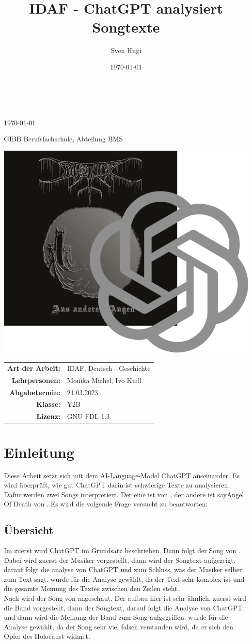 \documentclass[twocolumn,10pt]{article}
\author{Sven Hugi}
\title{IDAF - ChatGPT analysiert Songtexte}
\date{\today}
\makeatletter
\renewcommand{\maketitle}{
	\begin{center}

		\vspace*{.125\textheight}
		{\Huge \textbf{\@title}\\}
		{\LARGE \textbf{\@author}\\}
		{\large \today\\}
		{\Large GIBB Berufsfachschule, Abteilung BMS\par\vspace*{1cm}}
		\includegraphics[width=\linewidth]{title.png}
		\vfill
		\begin{center}
			\begin{tabularx}{.4\linewidth}{rl}
				\textbf{Art der Arbeit:}				& IDAF, Deutsch - Geschichte\\
				\textbf{Lehrpersonen:}					& Monika Michel, Ivo Knill\\
				\textbf{Abgabetermin:}					& 21.03.2023\\
				\textbf{Klasse:}						& Y2B	\\
				\textbf{Lizenz:}						&
				GNU FDL 1.3
			\end{tabularx}
		\end{center}
		
	\end{center}
}
\makeatother
\begin{document}
	\begin{titlepage}
		\maketitle
		\thispagestyle{empty}
	\end{titlepage}

	\pagestyle{fancy}
	\tableofcontents
	\clearpage
	
	\section{Einleitung}
		Diese Arbeit setzt sich mit dem AI-Language-Model ChatGPT\cite{ChatGPT} auseinander. Es wird überprüft, wie gut ChatGPT darin ist schwierige Texte zu analysieren. Dafür werden zwei Songs interpretiert. Der eine ist  von , der andere ist say{Angel Of Death} von . Es wird die volgende Frage versucht zu beantworten:\\
		\textbf{}
		\subsection{Übersicht}
		Im zuerst wird ChatGPT\cite{ChatGPT} im Grundsatz beschrieben. Dann folgt der Song  von . Dabei wird zuerst der Musiker vorgestellt, dann wird der Songtext aufgezeigt, darauf folgt die analyse von ChatGPT und zum Schluss, was der Musiker selber zum Text sagt.  wurde für die Analyse gewählt, da der Text sehr komplex ist und die gesamte Meinung des Textes zwischen den Zeilen steht.\\
		Nach  wird der Song  von  angeschaut. Der aufbau hier ist sehr ähnlich, zuerst wird die Band vorgestellt, dann der Songtext, darauf folgt die Analyse von ChatGPT und dann wird die Meinung der Band zum Song aufgegriffen.  wurde für die Analyse gewählt, da der Song sehr viel falsch verstanden wird, da er sich den Opfer des Holocaust widmet.
\end{document}
